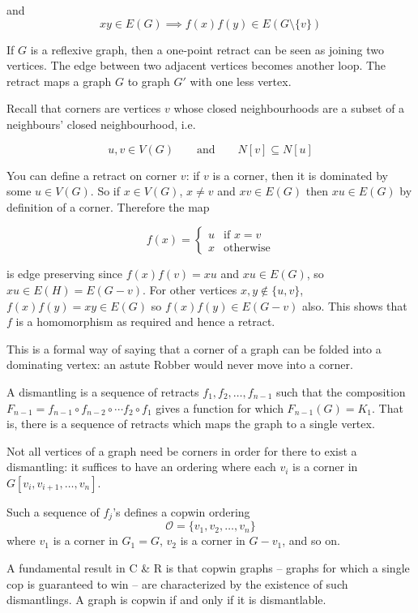 and
\[ xy \in E(G) \implies f(x)f(y) \in E(G \setminus \{ v \}) \]

If $G$ is a reflexive graph, then a one-point retract can be seen as joining
two vertices. The edge between two adjacent vertices becomes another loop.
The retract maps a graph $G$ to graph $G'$ with one less vertex.

Recall that corners are vertices $v$ whose closed neighbourhoods
are a subset of a neighbours' closed neighbourhood, i.e.

\[u,v\in V(G) \qquad \text{and} \qquad N[v] \subseteq N[u] \]

You can define a retract on corner $v$: if $v$ is a corner, then it is
dominated by some $u \in V(G)$. So if $x \in V(G)$, $x \neq v$ and
$xv \in E(G)$ then $xu \in E(G)$ by definition of a corner. Therefore the map

\[ f(x) = \begin{cases}
u & \text{if } x = v \\
x & \text{otherwise}
\end{cases} \]

is edge preserving since $f(x)f(v) = xu$ and $xu \in E(G)$, so $xu \in E(H) = E(G - v)$.
For other vertices $x,y \not\in \{u,v\}$, $f(x)f(y) = xy \in E(G)$ so $f(x)f(y) \in E(G- v)$ also.
This shows that $f$ is a homomorphism as required and hence a retract.

This is a formal way of saying that a corner of a graph can be folded into a
dominating vertex: an astute Robber would never move into a corner.

A dismantling is a sequence of retracts $f_1, f_2, \dots, f_{n-1}$ such that the
composition $F_{n-1} = f_{n-1} \circ f_{n-2} \circ \cdots f_2 \circ f_1$ gives a
function for which $F_{n-1} (G) = K_1$. That is, there is a sequence of retracts
which maps the graph to a single vertex.

Not all vertices of a graph need be corners in order for there
to exist a dismantling: it suffices to have an ordering where each $v_i$ is a corner in
$G[v_i, v_{i+1}, \dots, v_n]$.

Such a sequence of $f_j$'s defines a copwin ordering
\[ \mathcal{O} = \{ v_1, v_2, \dots, v_n\} \]
 where $v_1$ is a corner in $G_1 = G$, $v_2$ is a corner in $G - v_1$, and so on.

A fundamental result in C \& R is that copwin graphs -- graphs for which a single
cop is guaranteed to win --  are characterized by the existence of such dismantlings.
A graph is copwin if and only if it is dismantlable.



